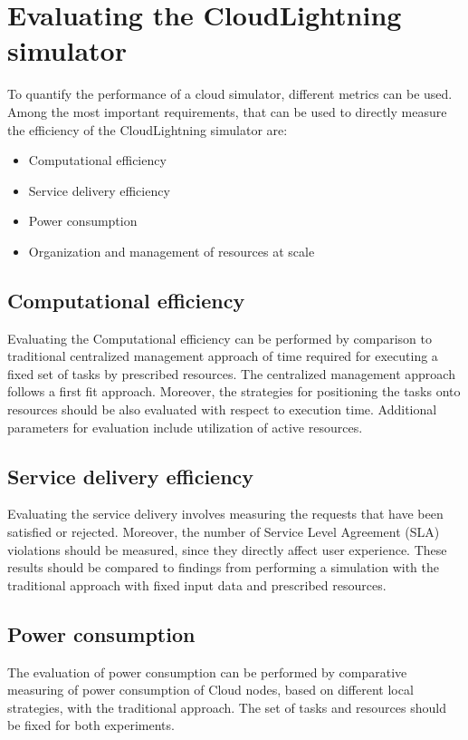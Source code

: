 \section{Evaluating the CloudLightning simulator}

To quantify the performance of a cloud simulator, different metrics can be used. Among the most important requirements, that can be used to directly measure the efficiency of the CloudLightning simulator are:

\begin{itemize}
\item Computational efficiency
\item Service delivery efficiency
\item Power consumption
\item Organization and management of resources at scale
\end{itemize}

\subsection{Computational efficiency}

Evaluating the Computational efficiency can be performed by comparison to traditional centralized management approach of time required for executing a fixed set of tasks by prescribed resources. The centralized management approach follows a first fit approach. Moreover, the strategies for positioning the tasks onto resources should be also evaluated with respect to execution time. Additional parameters for evaluation include utilization of active resources.

\subsection{Service delivery efficiency}

Evaluating the service delivery involves measuring the requests that have been satisfied or rejected. Moreover, the number of Service Level Agreement (SLA) violations should be measured, since they directly affect user experience. These results should be compared to findings from performing a simulation with the traditional approach with fixed input data and prescribed resources.

\subsection{Power consumption}

The evaluation of power consumption can be performed by comparative measuring of power consumption of Cloud nodes, based on different local strategies, with the traditional approach. The set of tasks and resources should be fixed for both experiments.


